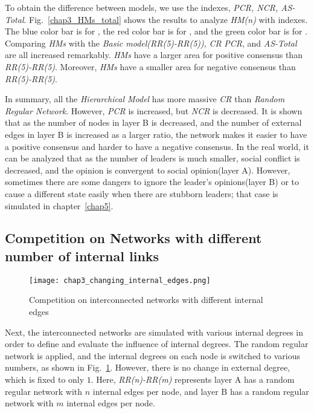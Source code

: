 To obtain the difference between models, we use the indexes, \textit{PCR, NCR, AS-Total}. Fig.~\ref{chap3_HMs_total} shows the results to analyze \textit{HM(n)} with indexes. The blue color bar is for , the red color bar is for , and the green color bar is for . Comparing \textit{HMs} with the \textit{Basic model(RR(5)-RR(5))}, \textit{CR} \textit{PCR}, and \textit{AS-Total} are all increased remarkably. \textit{HMs} have a larger area for positive consensus than \textit{RR(5)-RR(5)}. Moreover, \textit{HMs} have a smaller area for negative consensus than \textit{RR(5)-RR(5)}. 

In summary, all the \textit{Hierarchical Model} has more massive \textit{CR} than \textit{Random Regular Network}. However, \textit{PCR} is increased, but \textit{NCR} is decreased. It is shown that as the number of nodes in layer B is decreased, and the number of external edges in layer B is increased as a larger ratio, the network makes it easier to have a positive consensus and harder to have a negative consensus. In the real world, it can be analyzed that as the number of leaders is much smaller, social conflict is decreased, and the opinion is convergent to social opinion(layer A). However, sometimes there are some dangers to ignore the leader's opinions(layer B) or to cause a different state easily when there are stubborn leaders; that case is simulated in chapter~\ref{chap5}. \\

\subsection{Competition on Networks with different number of internal links}

\begin{figure}[!htb]
	\centering
	\texttt{[image: chap3\_changing\_internal\_edges.png]}
	\caption{Competition on interconnected networks with different internal edges}
	\label{chap3_changing_internal_edges}
\end{figure}

Next, the interconnected networks are simulated with various internal degrees in order to define and evaluate the influence of internal degrees. The random regular network is applied, and the internal degrees on each node is switched to various numbers, as shown in Fig.~\ref{chap3_changing_internal_edges}. However, there is no change in external degree, which is fixed to only $1$. Here, \textit{RR(n)-RR(m)} represents layer A has a random regular network with $n$ internal edges per node, and layer B has a random regular network with $m$ internal edges per node.

